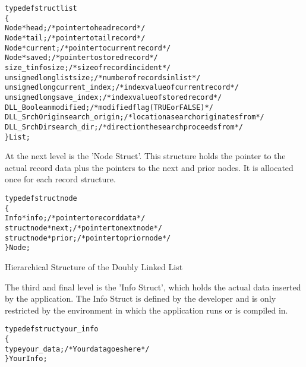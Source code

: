 \documentclass[10pt,letterpaper,titlepage]{article}
\begin{document}
\small
\begin{alltt}

typedef struct list
   \{
   Node           *head;         /* pointer to head record */
   Node           *tail;         /* pointer to tail record */
   Node           *current;      /* pointer to current record */
   Node           *saved;        /* pointer to stored record */
   size_t         infosize;      /* size of record incident */
   unsigned long  listsize;      /* number of records in list */
   unsigned long  current_index; /* index value of current record */
   unsigned long  save_index;    /* index value of stored record */
   DLL_Boolean    modified;      /* modified flag (TRUE or FALSE) */
   DLL_SrchOrigin search_origin; /* location a search originates from */
   DLL_SrchDir    search_dir;    /* direction the search proceeds from */
   \} List;
\end{alltt}
\normalsize
\vspace{8pt}

\noindent
At the next level is the 'Node Struct'.  This structure holds the pointer to the actual record data plus the pointers to the next and prior nodes.  It is allocated once for each record structure.

\small
\begin{alltt}
typedef struct node
   \{
   Info        *info;     /* pointer to record data */
   struct node *next;     /* pointer to next node */
   struct node *prior;    /* pointer to prior node */
   \} Node;
\end{alltt}
\normalsize
\vspace{8pt}

\pagebreak
\noindent
{}
\vspace{8pt}

\begin{center}
Hierarchical Structure of the Doubly Linked List
\end{center}

\pagebreak
\noindent
The third and final level is the 'Info Struct', which holds the actual data inserted by the application.  The Info Struct is defined by the developer and is only restricted by the environment in which the application runs or is compiled in.

\small
\begin{alltt}
typedef struct your_info
   \{
   type your_data;        /* Your data goes here */
   \} YourInfo;
\end{alltt}
\normalsize
\vspace{8pt}
\end{document}
